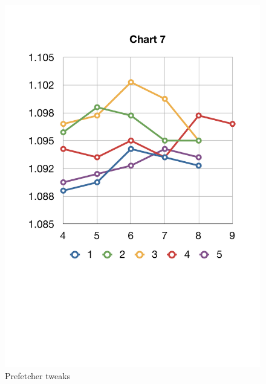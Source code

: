 \begin{figure}
	\centering \includegraphics[scale=0.5]{img/prefetcher_tweaks.pdf}
	\caption{Prefetcher tweaks}
	\label{fig:prefetcher_tweaks}
\end{figure}